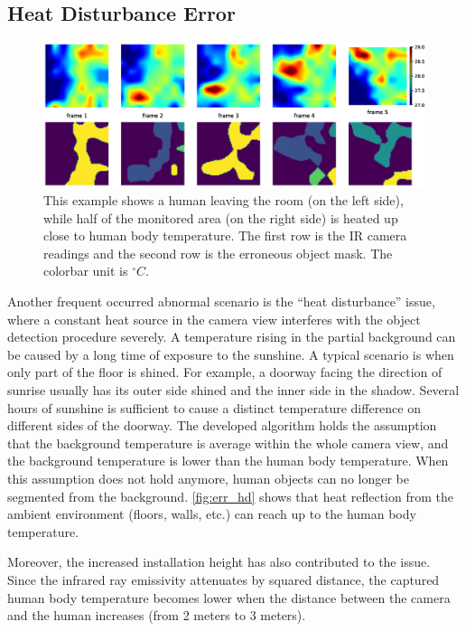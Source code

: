 \subsection{Heat Disturbance Error}
\begin{figure}
  \centering
  \includegraphics[width=\textwidth]{figures/err_heatdisturb.eps}
  \caption{This example shows a human leaving the room (on the left side), while half of the monitored area (on the right side) is heated up close to human body temperature. The first row is the IR camera readings and the second row is the erroneous object mask. The colorbar unit is $^\circ C$.}\label{fig:err_hd}
\end{figure}
Another frequent occurred abnormal scenario is the ``heat disturbance'' issue, where a constant heat source in the camera view interferes with the object detection procedure severely. A temperature rising in the partial background can be caused by a long time of exposure to the sunshine. A typical scenario is when only part of the floor is shined. For example, a doorway facing the direction of sunrise usually has its outer side shined and the inner side in the shadow. Several hours of sunshine is sufficient to cause a distinct temperature difference on different sides of the doorway. The developed algorithm holds the assumption that the background temperature is average within the whole camera view, and the background temperature is lower than the human body temperature. When this assumption does not hold anymore, human objects can no longer be segmented from the background. \autoref{fig:err_hd} shows that heat reflection from the ambient environment (floors, walls, etc.) can reach up to the human body temperature.

Moreover, the increased installation height has also contributed to the issue. Since the infrared ray emissivity attenuates by squared distance, the captured human body temperature becomes lower when the distance between the camera and the human increases (from 2 meters to 3 meters).

